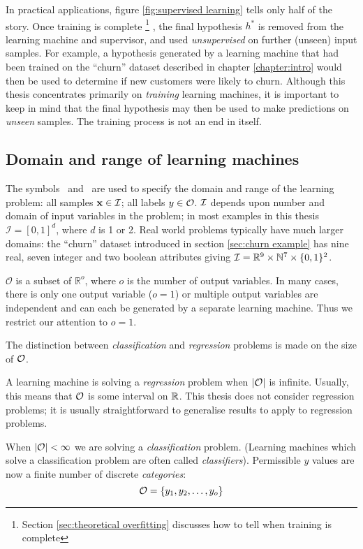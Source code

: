 In practical applications, figure \ref{fig:supervised learning} tells
only half of the story.  Once training is complete%
\footnote{Section \ref{sec:theoretical overfitting} discusses how to
tell when training is complete}%
, the final hypothesis $h^{\ast}$ is removed from the learning machine
and supervisor, and used \emph{unsupervised} on further (unseen) input
samples.  For example, a hypothesis generated by a learning machine
that had been trained on the ``churn'' dataset described in chapter
\ref{chapter:intro} would then be used to determine if new customers
were likely to churn.  Although this thesis concentrates primarily on
\emph{training} learning machines, it is important to keep in mind that
the final hypothesis may then be used to make predictions on
\emph{unseen} samples.  The training process is not an end in itself.


\subsection{Domain and range of learning machines}
\label{sec:domain and range}

The symbols \calI\ and \calO\ are used to specify the domain and
range of the learning problem: all samples $\mathbf{x} \in \mathcal{I}$; all
labels $y \in \mathcal{O}$.  $\mathcal{I}$ depends upon number and
domain of input variables in the problem; in most examples in this
thesis $\mathcal{I} = [0,1]^d$, where $d$ is 1 or 2.  Real world
problems typically have much larger domains: the ``churn'' dataset
introduced in section \ref{sec:churn example} has nine real, seven
integer and two boolean attributes giving $\mathcal{I} = \mathbb{R}^9 \times \mathbb{N}^7
\times \{0, 1\}^2$.

$\mathcal{O}$ is a subset of $\mathbb{R}^o$, where $o$ is the number
of output variables.  In many cases, there is only one output
variable ($o=1$) or multiple output variables are independent and
can each be generated by a separate learning machine.  Thus we
restrict our attention to $o=1$.

The distinction between \emph{classification} and \emph{regression}
problems is made on the size of $\mathcal{O}$.

A learning machine is solving a \emph{regression} problem when
$|\mathcal{O}|$ is infinite.  Usually, this means that $\mathcal{O}$ is some
interval on $\mathbb{R}$.  This thesis does not consider regression
problems; it is usually straightforward to generalise results to apply
to regression problems.

When $|\mathcal{O}| < \infty$ we are solving a \emph{classification}
problem.  (Learning machines which solve a classification problem are
often called \emph{classifiers}).  Permissible $y$ values are now
a finite number of discrete \emph{categories}:
%
\begin{equation}
\mathcal{O} = \{y_1, y_2, \ldots, y_o\}
\end{equation}

